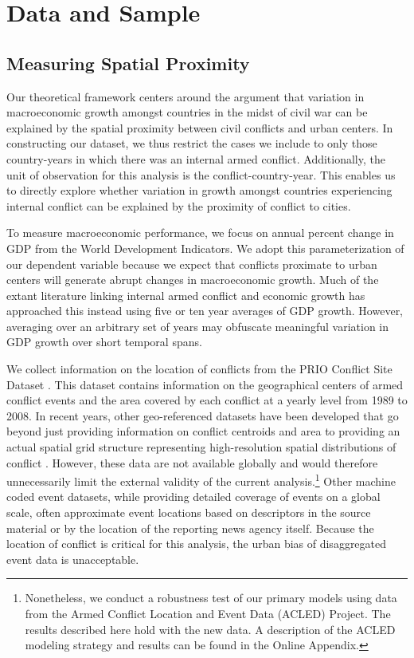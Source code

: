 
\section{Data and Sample}
\label{empirics}

\subsection{Measuring Spatial Proximity}

Our theoretical framework centers around the argument that variation in macroeconomic growth amongst countries in the midst of civil war can be explained by the spatial proximity between civil conflicts and urban centers. In constructing our dataset, we thus restrict the cases we include to only those country-years in which there was an internal armed conflict. Additionally, the unit of observation for this analysis is the conflict-country-year. This enables us to directly explore whether variation in growth amongst countries experiencing internal conflict can be explained by the proximity of conflict to cities.

To measure macroeconomic performance, we focus on annual percent change in GDP from the World Development Indicators. We adopt this parameterization of our dependent variable because we expect that conflicts proximate to urban centers will generate abrupt changes in macroeconomic growth. Much of the extant literature linking internal armed conflict and economic growth has approached this instead using five or ten year averages of GDP growth. However, averaging over an arbitrary set of years may obfuscate meaningful variation in GDP growth over short temporal spans.

We collect information on the location of conflicts from the PRIO Conflict Site Dataset \citep{hallberg:2012}. This dataset contains information on the geographical centers of armed conflict events and the area covered by each conflict at a yearly level from 1989 to 2008. In recent years, other geo-referenced datasets have been developed that go beyond just providing information on conflict centroids and area to providing an actual spatial grid structure representing high-resolution spatial distributions of conflict \citep{tollefsen:etal:2012}. However, these data are not available globally and would therefore unnecessarily limit the external validity of the current analysis.\footnote{Nonetheless, we conduct a robustness test of our primary models using data from the Armed Conflict Location and Event Data (ACLED) Project. The results described here hold with the new data. A description of the ACLED modeling strategy and results can be found in the Online Appendix.} Other machine coded event datasets, while providing detailed coverage of events on a global scale, often approximate event locations based on descriptors in the source material or by the location of the reporting news agency itself. Because the location of conflict is critical for this analysis, the urban bias of disaggregated event data is unacceptable.

